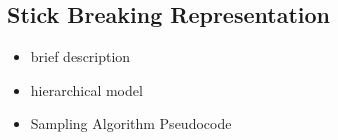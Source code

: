 \subsection{Stick Breaking Representation}

\begin{itemize}
	\item brief description
	\item hierarchical model
	\item Sampling Algorithm Pseudocode
\end{itemize}

